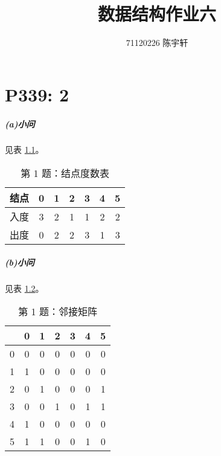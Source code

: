 \documentclass{ctexrep}
\author{71120226 陈宇轩}
\title{数据结构作业六}
\begin{document}
    \maketitle

    \tableofcontents

    \chapter{P339: 2}

    \paragraph{(a)小问} 见表 \ref{table:p1_1}。

    \begin{table}[hp]
        \centering
        \caption{第 1 题：结点度数表}
        \label{table:p1_1}
        \begin{tabular}{|*{7}{c|}}
            \hline
            结点 & 0 & 1 & 2 & 3 & 4 & 5 \\ \hline
            入度 & 3 & 2 & 1 & 1 & 2 & 2 \\ \hline
            出度 & 0 & 2 & 2 & 3 & 1 & 3 \\ \hline
        \end{tabular}
    \end{table}

    \paragraph{(b)小问} 见表 \ref{table:p1_2}。

    \begin{table}[hp]
        \centering
        \caption{第 1 题：邻接矩阵}
        \label{table:p1_2}
        \begin{tabular}{|*{7}{c|}}
            \hline
              & 0 & 1 & 2 & 3 & 4 & 5 \\ \hline
            0 & 0 & 0 & 0 & 0 & 0 & 0 \\ \hline
            1 & 1 & 0 & 0 & 0 & 0 & 0 \\ \hline
            2 & 0 & 1 & 0 & 0 & 0 & 1 \\ \hline
            3 & 0 & 0 & 1 & 0 & 1 & 1 \\ \hline
            4 & 1 & 0 & 0 & 0 & 0 & 0 \\ \hline
            5 & 1 & 1 & 0 & 0 & 1 & 0 \\ \hline
        \end{tabular}
    \end{table}
\end{document}
